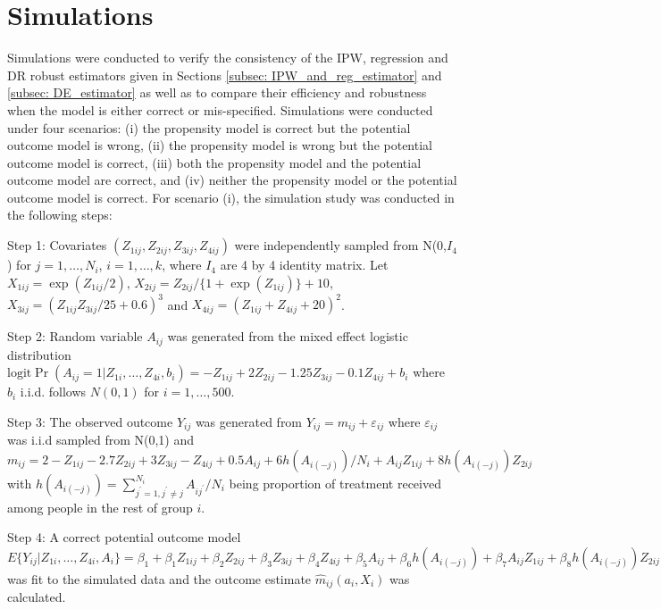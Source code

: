 \documentclass[oupdraft]{bio}
\begin{document}
\section{Simulations}\label{sec: DR_simulation}

Simulations were conducted to verify the consistency of the IPW, regression and DR robust estimators given in Sections \ref{subsec: IPW_and_reg_estimator} and \ref{subsec: DE_estimator} as well as to compare their efficiency and robustness when the model is either correct or mis-specified.
Simulations were conducted under four
scenarios: (i) the propensity model is correct but the potential outcome model is wrong, (ii) the propensity model is wrong but the potential outcome model is correct, (iii) both the propensity model and the potential outcome model are correct, and (iv) neither the propensity model or the potential outcome model is correct. For scenario (i), the simulation study was conducted in
the following steps:

\noindent \hangindent=1.5cm Step 1: Covariates $(Z_{1ij},Z_{2ij},Z_{3ij},Z_{4ij})$ were independently sampled from N(0,$I_4$) for $j = 1,\ldots,N_i$, $i=1,\ldots,k$, where $I_4$ are 4 by 4 identity matrix. Let $X_{1ij}=\exp(Z_{1ij}/2)$, $X_{2ij}=Z_{2ij}/\{1+\exp(Z_{1ij})\}+10$, $X_{3ij}=(Z_{1ij}Z_{3ij}/25+0.6)^3$ and $X_{4ij}=(Z_{1ij}+Z_{4ij}+20)^2$.

\noindent \hangindent=1.5cm Step 2: Random variable $A_{ij}$ was generated from the mixed effect logistic distribution $\mbox{logit}\Pr(A_{ij}=1|Z_{1i},\ldots,Z_{4i},b_i)=-Z_{1ij}+2Z_{2ij}-1.25Z_{3ij}-0.1Z_{4ij}+b_i$ where $b_{i}$ i.i.d. follows $N(0,1)$ for $i=1,\ldots,500$.

\noindent \hangindent=1.5cm Step 3: The observed outcome $Y_{ij}$ was generated from $Y_{ij}=m_{ij}+\varepsilon_{ij}$ where $\varepsilon_{ij}$ was i.i.d sampled from N(0,1) and $m_{ij}=2-Z_{1ij}-2.7Z_{2ij}+3Z_{3ij}-Z_{4ij}+0.5A_{ij}+6h(A_{i(-j)})/N_i+A_{ij}Z_{1ij}+8h(A_{i(-j)})Z_{2ij}$ with $h(A_{i(-j)})=\sum_{j^{'}=1,j^{'}\neq j}^{N_i}A_{ij^{'}}/N_i$ being proportion of treatment received among people in the rest of group $i$. 

\noindent \hangindent=1.5cm Step 4: A correct potential outcome model $E\{Y_{ij}|Z_{1i},\ldots,Z_{4i},A_i\}=\beta_1+
\beta_1Z_{1ij}+\beta_2Z_{2ij}+\beta_3Z_{3ij}+\beta_4Z_{4ij}+\beta_5A_{ij}+
\beta_6h(A_{i(-j)})+\beta_7A_{ij}Z_{1ij}+\beta_8h(A_{i(-j)})Z_{2ij}$ was fit to the simulated data and the outcome estimate $\hat{m}_{ij}(a_i,X_i)$ was calculated. 
\end{document}
